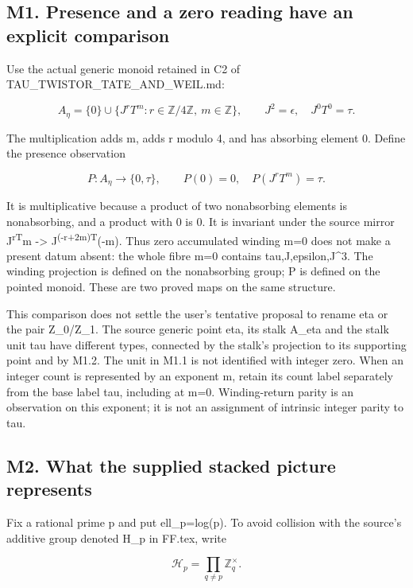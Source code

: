\subsection{M1. Presence and a zero reading have an explicit
comparison}\label{m1.-presence-and-a-zero-reading-have-an-explicit-comparison}

Use the actual generic monoid retained in C2 of
TAU\_TWISTOR\_TATE\_AND\_WEIL.md:

\[
A_\eta=\{0\}\cup\{J^rT^m:r\in\mathbb Z/4\mathbb Z,\ m\in\mathbb Z\},
\qquad J^2=\epsilon,\quad J^0T^0=\tau.
\tag{M1.1}
\]

The multiplication adds m, adds r modulo 4, and has absorbing element 0.
Define the presence observation

\[
P:A_\eta\longrightarrow\{0,\tau\},\qquad
P(0)=0,\quad P(J^rT^m)=\tau.
\tag{M1.2}
\]

It is multiplicative because a product of two nonabsorbing elements is
nonabsorbing, and a product with 0 is 0. It is invariant under the
source mirror J\textsuperscript{rT}m -\textgreater{}
J\textsuperscript{(-r+2m)T}(-m). Thus zero accumulated winding m=0 does
not make a present datum absent: the whole fibre m=0 contains
tau,J,epsilon,J\^{}3. The winding projection is defined on the
nonabsorbing group; P is defined on the pointed monoid. These are two
proved maps on the same structure.

This comparison does not settle the user's tentative proposal to rename
eta or the pair Z\_0/Z\_1. The source generic point eta, its stalk
A\_eta and the stalk unit tau have different types, connected by the
stalk's projection to its supporting point and by M1.2. The unit in M1.1
is not identified with integer zero. When an integer count is
represented by an exponent m, retain its count label separately from the
base label tau, including at m=0. Winding-return parity is an
observation on this exponent; it is not an assignment of intrinsic
integer parity to tau.

\subsection{M2. What the supplied stacked picture
represents}\label{m2.-what-the-supplied-stacked-picture-represents}

Fix a rational prime p and put ell\_p=log(p). To avoid collision with
the source's additive group denoted H\_p in FF.tex, write

\[
\mathcal H_p=\prod_{q\ne p}\mathbb Z_q^\times.
\tag{M2.1}
\]

